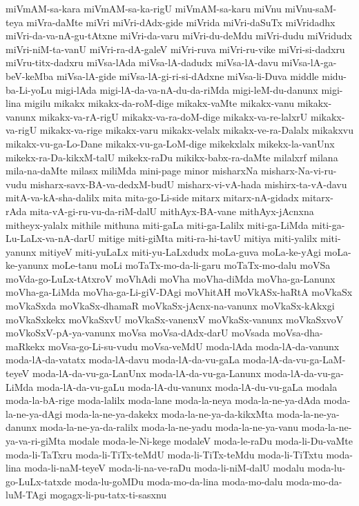{miVmAM-sa-kara
miVmAM-sa-ka-rigU
miVmAM-sa-karu
miVnu
miVnu-saM-teya
miVra-daMte
miVri
miVri-dAdx-gide
miVrida
miVri-daSuTx
miVridadhx
miVri-da-va-nA-gu-tAtxne
miVri-da-varu
miVri-du-deMdu
miVri-dudu
miVridudx
miVri-niM-ta-vanU
miVri-ra-dA-galeV
miVri-ruva
miVri-ru-vike
miVri-si-dadxru
miVru-titx-dadxru
miVsa-lAda
miVsa-lA-dadudx
miVsa-lA-davu
miVsa-lA-ga-beV-keMba
miVsa-lA-gide
miVsa-lA-gi-ri-si-dAdxne
miVsa-li-Duva
middle
midu-ba-Li-yoLu
migi-lAda
migi-lA-da-va-nA-du-da-riMda
migi-leM-du-danunx
migi-lina
migilu
mikakx
mikakx-da-roM-dige
mikakx-vaMte
mikakx-vanu
mikakx-vanunx
mikakx-va-rA-rigU
mikakx-va-ra-doM-dige
mikakx-va-re-lalxrU
mikakx-va-rigU
mikakx-va-rige
mikakx-varu
mikakx-velalx
mikakx-ve-ra-Dalalx
mikakxvu
mikakx-vu-ga-Lo-Dane
mikakx-vu-ga-LoM-dige
mikekxlalx
mikekx-la-vanUnx
mikekx-ra-Da-kikxM-talU
mikekx-raDu
mikikx-babx-ra-daMte
milalxrf
milana
mila-na-daMte
milasx
miliMda
mini-page
minor
misharxNa
misharx-Na-vi-ru-vudu
misharx-savx-BA-va-dedxM-budU
misharx-vi-vA-hada
mishirx-ta-vA-davu
mitA-va-kA-sha-dalilx
mita
mita-go-Li-side
mitarx
mitarx-nA-gidadx
mitarx-rAda
mita-vA-gi-ru-vu-da-riM-dalU
mithAyx-BA-vane
mithAyx-jAcnxna
mitheyx-yalalx
mithile
mithuna
miti-gaLa
miti-ga-Lalilx
miti-ga-LiMda
miti-ga-Lu-LaLx-va-nA-darU
mitige
miti-giMta
miti-ra-hi-tavU
mitiya
miti-yalilx
miti-yanunx
mitiyeV
miti-yuLaLx
miti-yu-LaLxdudx
moLa-guva
moLa-ke-yAgi
moLa-ke-yanunx
moLe-tanu
moLi
moTaTx-mo-da-li-garu
moTaTx-mo-dalu
moVSa
moVda-go-LuLx-tAtxroV
moVhAdi
moVha
moVha-diMda
moVha-ga-Lanunx
moVha-ga-LiMda
moVha-ga-Li-giV-DAgi
moVhitAH
moVkASx-haRtA
moVkaSx
moVkaSxda
moVkaSx-dhamaR
moVkaSx-jAcnx-na-vanunx
moVkaSx-kAkxgi
moVkaSxkekx
moVkaSxvU
moVkaSx-vanenxV
moVkaSx-vanunx
moVkaSxvoV
moVkoSxV-pA-ya-vanunx
moVsa
moVsa-dAdx-darU
moVsada
moVsa-dha-maRkekx
moVsa-go-Li-su-vudu
moVsa-veMdU
moda-lAda
moda-lA-da-vanunx
moda-lA-da-vatatx
moda-lA-davu
moda-lA-da-vu-gaLa
moda-lA-da-vu-ga-LaM-teyeV
moda-lA-da-vu-ga-LanUnx
moda-lA-da-vu-ga-Lanunx
moda-lA-da-vu-ga-LiMda
moda-lA-da-vu-gaLu
moda-lA-du-vanunx
moda-lA-du-vu-gaLa
modala
moda-la-bA-rige
moda-lalilx
moda-lane
moda-la-neya
moda-la-ne-ya-dAda
moda-la-ne-ya-dAgi
moda-la-ne-ya-dakekx
moda-la-ne-ya-da-kikxMta
moda-la-ne-ya-danunx
moda-la-ne-ya-da-ralilx
moda-la-ne-yadu
moda-la-ne-ya-vanu
moda-la-ne-ya-va-ri-giMta
modale
moda-le-Ni-kege
modaleV
moda-le-raDu
moda-li-Du-vaMte
moda-li-TaTxru
moda-li-TiTx-teMdU
moda-li-TiTx-teMdu
moda-li-TiTxtu
moda-lina
moda-li-naM-teyeV
moda-li-na-ve-raDu
moda-li-niM-dalU
modalu
moda-lu-go-LuLx-tatxde
moda-lu-goMDu
moda-mo-da-lina
moda-mo-dalu
moda-mo-da-luM-TAgi
mogagx-li-pu-tatx-ti-sasxnu
}
